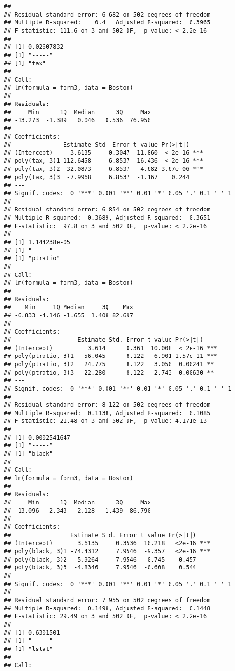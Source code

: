 \documentclass[]{article}
\begin{document}
\begin{verbatim}
## 
## Residual standard error: 6.682 on 502 degrees of freedom
## Multiple R-squared:    0.4,  Adjusted R-squared:  0.3965 
## F-statistic: 111.6 on 3 and 502 DF,  p-value: < 2.2e-16
## 
## [1] 0.02607832
## [1] "-----"
## [1] "tax"
## 
## Call:
## lm(formula = form3, data = Boston)
## 
## Residuals:
##     Min      1Q  Median      3Q     Max 
## -13.273  -1.389   0.046   0.536  76.950 
## 
## Coefficients:
##               Estimate Std. Error t value Pr(>|t|)    
## (Intercept)     3.6135     0.3047  11.860  < 2e-16 ***
## poly(tax, 3)1 112.6458     6.8537  16.436  < 2e-16 ***
## poly(tax, 3)2  32.0873     6.8537   4.682 3.67e-06 ***
## poly(tax, 3)3  -7.9968     6.8537  -1.167    0.244    
## ---
## Signif. codes:  0 '***' 0.001 '**' 0.01 '*' 0.05 '.' 0.1 ' ' 1
## 
## Residual standard error: 6.854 on 502 degrees of freedom
## Multiple R-squared:  0.3689, Adjusted R-squared:  0.3651 
## F-statistic:  97.8 on 3 and 502 DF,  p-value: < 2.2e-16
## 
## [1] 1.144238e-05
## [1] "-----"
## [1] "ptratio"
## 
## Call:
## lm(formula = form3, data = Boston)
## 
## Residuals:
##    Min     1Q Median     3Q    Max 
## -6.833 -4.146 -1.655  1.408 82.697 
## 
## Coefficients:
##                   Estimate Std. Error t value Pr(>|t|)    
## (Intercept)          3.614      0.361  10.008  < 2e-16 ***
## poly(ptratio, 3)1   56.045      8.122   6.901 1.57e-11 ***
## poly(ptratio, 3)2   24.775      8.122   3.050  0.00241 ** 
## poly(ptratio, 3)3  -22.280      8.122  -2.743  0.00630 ** 
## ---
## Signif. codes:  0 '***' 0.001 '**' 0.01 '*' 0.05 '.' 0.1 ' ' 1
## 
## Residual standard error: 8.122 on 502 degrees of freedom
## Multiple R-squared:  0.1138, Adjusted R-squared:  0.1085 
## F-statistic: 21.48 on 3 and 502 DF,  p-value: 4.171e-13
## 
## [1] 0.0002541647
## [1] "-----"
## [1] "black"
## 
## Call:
## lm(formula = form3, data = Boston)
## 
## Residuals:
##     Min      1Q  Median      3Q     Max 
## -13.096  -2.343  -2.128  -1.439  86.790 
## 
## Coefficients:
##                 Estimate Std. Error t value Pr(>|t|)    
## (Intercept)       3.6135     0.3536  10.218   <2e-16 ***
## poly(black, 3)1 -74.4312     7.9546  -9.357   <2e-16 ***
## poly(black, 3)2   5.9264     7.9546   0.745    0.457    
## poly(black, 3)3  -4.8346     7.9546  -0.608    0.544    
## ---
## Signif. codes:  0 '***' 0.001 '**' 0.01 '*' 0.05 '.' 0.1 ' ' 1
## 
## Residual standard error: 7.955 on 502 degrees of freedom
## Multiple R-squared:  0.1498, Adjusted R-squared:  0.1448 
## F-statistic: 29.49 on 3 and 502 DF,  p-value: < 2.2e-16
## 
## [1] 0.6301501
## [1] "-----"
## [1] "lstat"
## 
## Call:

\end{verbatim}
\end{document}
